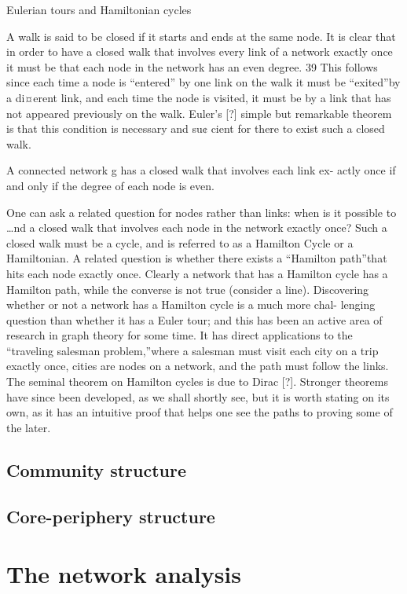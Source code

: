 Eulerian tours and Hamiltonian cycles

A walk is said to be closed if it starts and ends at the same node. It is clear that in
order to have a closed walk that involves every link of a network exactly once it must
be that each node in the network has an even degree. 39 This follows since each time a
node is “entered” by one link on the walk it must be “exited”by a di¤erent link, and
each time the node is visited, it must be by a link that has not appeared previously on
the walk. Euler’s [?] simple but remarkable theorem is that this condition is necessary
and su¢ cient for there to exist such a closed walk.

A connected network g has a closed walk that involves each link ex-
actly once if and only if the degree of each node is even.


One can ask a related question for nodes rather than links: when is it possible to
…nd a closed walk that involves each node in the network exactly once? Such a closed
walk must be a cycle, and is referred to as a Hamilton Cycle or a Hamiltonian. A
related question is whether there exists a “Hamilton path”that hits each node exactly
once. Clearly a network that has a Hamilton cycle has a Hamilton path, while the
converse is not true (consider a line).
Discovering whether or not a network has a Hamilton cycle is a much more chal-
lenging question than whether it has a Euler tour; and this has been an active area
of research in graph theory for some time. It has direct applications to the “traveling
salesman problem,”where a salesman must visit each city on a trip exactly once, cities
are nodes on a network, and the path must follow the links.
The seminal theorem on Hamilton cycles is due to Dirac [?]. Stronger theorems
have since been developed, as we shall shortly see, but it is worth stating on its own,
as it has an intuitive proof that helps one see the paths to proving some of the later.

\subsection{Community structure}

\subsection{Core-periphery structure} 

\section{The network analysis}

